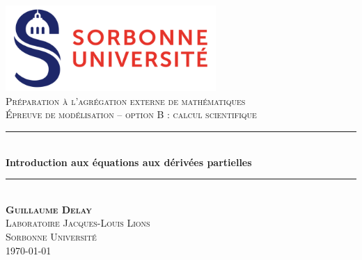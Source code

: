 \documentclass[12pt,a4paper,twoside]{article}
\begin{document}

\newcommand{\Ni}[1]{{\left\|#1\right\|}_\infty}
\newcommand{\HRule}{\rule{\linewidth}{0.5mm}} %

% 




\begin{titlepage}
  \begin{sffamily}
    \begin{center}
      \includegraphics[width = 8cm]{Figures/logo_SU.png}
      \\[1cm]
      \textsc{\LARGE Pr\'eparation \`a l'agr\'egation externe de math\'ematiques}
      \\[1cm]
      \textsc{\Large \'Epreuve de mod\'elisation -- option B : calcul scientifique}
      \\[2cm]
      \HRule \\[0.4cm]
      {\Large \bfseries Introduction aux \'equations aux d\'eriv\'ees partielles}
      \HRule \\[4cm]
      \textsc{\LARGE \bfseries Guillaume Delay}
      \\[2cm]
      \textsc{\Large Laboratoire Jacques-Louis Lions}
      \\[0.5cm]
      \textsc{\Large Sorbonne Universit\'e}
      \\[3cm]
      \today
    \end{center}
  \end{sffamily}
\end{titlepage}
\end{document}
